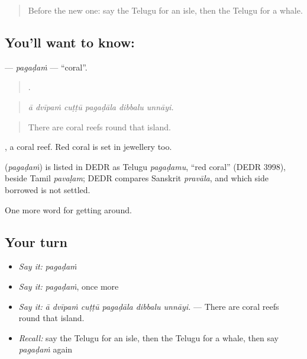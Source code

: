 \label{lesson:TE-C473-pagadam}



\begin{quote}
Before the new one: say the Telugu for an isle, then the Telugu for a whale.
\end{quote}

\subsection*{You'll want to know: }
\textbf{} — \emph{pagaḍaṁ} — \textquotedblleft{}coral\textquotedblright{}.

\begin{quote}
     .
\end{quote}

\begin{quote}
\emph{ā dvīpaṁ cuṭṭū pagaḍāla dibbalu unnāyi.}
\end{quote}

\begin{quote}
There are coral reefs round that island.
\end{quote}

 , a coral reef. Red coral is set in jewellery too.

\begin{cousinweb}
\textbf{} (\emph{pagaḍaṁ}) is listed in DEDR as Telugu \emph{pagaḍamu}, \textquotedblleft{}red coral\textquotedblright{} (DEDR 3998), beside Tamil \emph{pavaḷam}; DEDR compares Sanskrit \emph{pravāla}, and which side borrowed is not settled.
\end{cousinweb}

\begin{grammarlens}[title={What you've built}]
One more word for getting around.
\end{grammarlens}

\subsection*{Your turn}
\begin{itemize}
\raggedright
  \item \emph{Say it:} \emph{pagaḍaṁ}
  \item \emph{Say it:} \emph{pagaḍaṁ}, once more
  \item \emph{Say it:} \emph{ā dvīpaṁ cuṭṭū pagaḍāla dibbalu unnāyi.} — There are coral reefs round that island.
  \item \emph{Recall:} say the Telugu for an isle, then the Telugu for a whale, then say \emph{pagaḍaṁ} again
\end{itemize}

